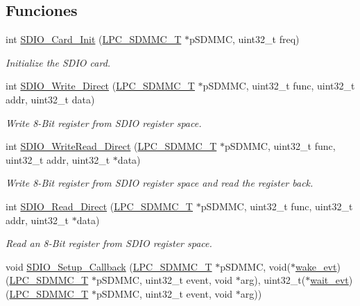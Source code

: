 \subsection*{Funciones}
\begin{DoxyCompactItemize}
\item 
int \hyperlink{group___s_d_i_o__18_x_x__43_x_x_ga8d72d28a7c358d7cd0f1595e55a60e7e}{S\+D\+I\+O\+\_\+\+Card\+\_\+\+Init} (\hyperlink{struct_l_p_c___s_d_m_m_c___t}{L\+P\+C\+\_\+\+S\+D\+M\+M\+C\+\_\+T} $\ast$p\+S\+D\+M\+MC, uint32\+\_\+t freq)
\begin{DoxyCompactList}\small\item\em Initialize the S\+D\+IO card. \end{DoxyCompactList}\item 
int \hyperlink{group___s_d_i_o__18_x_x__43_x_x_gac6afe352a20f90e630f5a45b808ddf5d}{S\+D\+I\+O\+\_\+\+Write\+\_\+\+Direct} (\hyperlink{struct_l_p_c___s_d_m_m_c___t}{L\+P\+C\+\_\+\+S\+D\+M\+M\+C\+\_\+T} $\ast$p\+S\+D\+M\+MC, uint32\+\_\+t func, uint32\+\_\+t addr, uint32\+\_\+t data)
\begin{DoxyCompactList}\small\item\em Write 8-\/\+Bit register from S\+D\+IO register space. \end{DoxyCompactList}\item 
int \hyperlink{group___s_d_i_o__18_x_x__43_x_x_gab98c1fffe319cb2353c6a220365eca49}{S\+D\+I\+O\+\_\+\+Write\+Read\+\_\+\+Direct} (\hyperlink{struct_l_p_c___s_d_m_m_c___t}{L\+P\+C\+\_\+\+S\+D\+M\+M\+C\+\_\+T} $\ast$p\+S\+D\+M\+MC, uint32\+\_\+t func, uint32\+\_\+t addr, uint32\+\_\+t $\ast$data)
\begin{DoxyCompactList}\small\item\em Write 8-\/\+Bit register from S\+D\+IO register space and read the register back. \end{DoxyCompactList}\item 
int \hyperlink{group___s_d_i_o__18_x_x__43_x_x_gab87874960f2ffedc091b12a6021c7424}{S\+D\+I\+O\+\_\+\+Read\+\_\+\+Direct} (\hyperlink{struct_l_p_c___s_d_m_m_c___t}{L\+P\+C\+\_\+\+S\+D\+M\+M\+C\+\_\+T} $\ast$p\+S\+D\+M\+MC, uint32\+\_\+t func, uint32\+\_\+t addr, uint32\+\_\+t $\ast$data)
\begin{DoxyCompactList}\small\item\em Read an 8-\/\+Bit register from S\+D\+IO register space. \end{DoxyCompactList}\item 
void \hyperlink{group___s_d_i_o__18_x_x__43_x_x_ga27a173a6ad1e2d681abaa8e95dddab69}{S\+D\+I\+O\+\_\+\+Setup\+\_\+\+Callback} (\hyperlink{struct_l_p_c___s_d_m_m_c___t}{L\+P\+C\+\_\+\+S\+D\+M\+M\+C\+\_\+T} $\ast$p\+S\+D\+M\+MC, void($\ast$\hyperlink{sdio__18xx__43xx_8c_a9d3ec75d1e15b0334b5f0bef82ada6b0}{wake\+\_\+evt})(\hyperlink{struct_l_p_c___s_d_m_m_c___t}{L\+P\+C\+\_\+\+S\+D\+M\+M\+C\+\_\+T} $\ast$p\+S\+D\+M\+MC, uint32\+\_\+t event, void $\ast$arg), uint32\+\_\+t($\ast$\hyperlink{sdio__18xx__43xx_8c_a6dbe39293b06ee6af0be7c83ed3fa71f}{wait\+\_\+evt})(\hyperlink{struct_l_p_c___s_d_m_m_c___t}{L\+P\+C\+\_\+\+S\+D\+M\+M\+C\+\_\+T} $\ast$p\+S\+D\+M\+MC, uint32\+\_\+t event, void $\ast$arg))

\end{DoxyCompactItemize}
